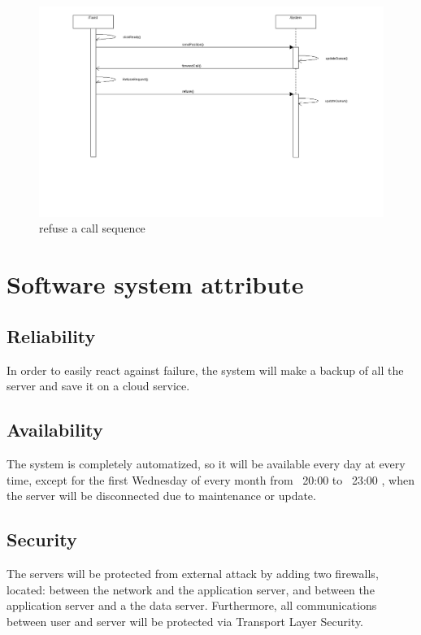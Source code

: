 \begin{center}
	\begin{figure} [h]
    	\includegraphics [scale=0.3]{sequencerefuse.png}
\caption {refuse a call sequence}
	\end{figure}
	\end{center}
	\newpage





\section{Software system attribute}
  \subsection{Reliability}
  In order to easily react against failure, the system will make a backup of all the server and save it on a cloud service.
  \subsection{Availability}
  The system is completely automatized, so it will be available every day at every time, except for the first Wednesday 
  of every month from ~20:00 to ~23:00 , when the server will be disconnected due to maintenance or update.
  \subsection{Security}
  The servers will be protected from external attack by adding two firewalls, located: between the network and the application server, 
  and between the application server and a the data server.
  Furthermore, all communications between user and server will be protected via Transport Layer Security.
